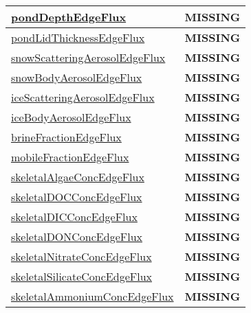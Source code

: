 {\begin{center}
\begin{longtable}{| p{2.0in} | p{4.0in} |}
    \hline
    \hyperref[subsec:var_sec_tracer_edge_fluxes_pondDepthEdgeFlux]{pondDepthEdgeFlux} & {\bf \color{red} MISSING} \\
    \hline
    \hyperref[subsec:var_sec_tracer_edge_fluxes_pondLidThicknessEdgeFlux]{pondLidThicknessEdgeFlux} & {\bf \color{red} MISSING} \\
    \hline
    \hyperref[subsec:var_sec_tracer_edge_fluxes_snowScatteringAerosolEdgeFlux]{snowScatteringAerosolEdgeFlux} & {\bf \color{red} MISSING} \\
    \hline
    \hyperref[subsec:var_sec_tracer_edge_fluxes_snowBodyAerosolEdgeFlux]{snowBodyAerosolEdgeFlux} & {\bf \color{red} MISSING} \\
    \hline
    \hyperref[subsec:var_sec_tracer_edge_fluxes_iceScatteringAerosolEdgeFlux]{iceScatteringAerosolEdgeFlux} & {\bf \color{red} MISSING} \\
    \hline
    \hyperref[subsec:var_sec_tracer_edge_fluxes_iceBodyAerosolEdgeFlux]{iceBodyAerosolEdgeFlux} & {\bf \color{red} MISSING} \\
    \hline
    \hyperref[subsec:var_sec_tracer_edge_fluxes_brineFractionEdgeFlux]{brineFractionEdgeFlux} & {\bf \color{red} MISSING} \\
    \hline
    \hyperref[subsec:var_sec_tracer_edge_fluxes_mobileFractionEdgeFlux]{mobileFractionEdgeFlux} & {\bf \color{red} MISSING} \\
    \hline
    \hyperref[subsec:var_sec_tracer_edge_fluxes_skeletalAlgaeConcEdgeFlux]{skeletalAlgaeConcEdgeFlux} & {\bf \color{red} MISSING} \\
    \hline
    \hyperref[subsec:var_sec_tracer_edge_fluxes_skeletalDOCConcEdgeFlux]{skeletalDOCConcEdgeFlux} & {\bf \color{red} MISSING} \\
    \hline
    \hyperref[subsec:var_sec_tracer_edge_fluxes_skeletalDICConcEdgeFlux]{skeletalDICConcEdgeFlux} & {\bf \color{red} MISSING} \\
    \hline
    \hyperref[subsec:var_sec_tracer_edge_fluxes_skeletalDONConcEdgeFlux]{skeletalDONConcEdgeFlux} & {\bf \color{red} MISSING} \\
    \hline
    \hyperref[subsec:var_sec_tracer_edge_fluxes_skeletalNitrateConcEdgeFlux]{skeletalNitrateConcEdgeFlux} & {\bf \color{red} MISSING} \\
    \hline
    \hyperref[subsec:var_sec_tracer_edge_fluxes_skeletalSilicateConcEdgeFlux]{skeletalSilicateConcEdgeFlux} & {\bf \color{red} MISSING} \\
    \hline
    \hyperref[subsec:var_sec_tracer_edge_fluxes_skeletalAmmoniumConcEdgeFlux]{skeletalAmmoniumConcEdgeFlux} & {\bf \color{red} MISSING} \\

\end{longtable}
\end{center}}
